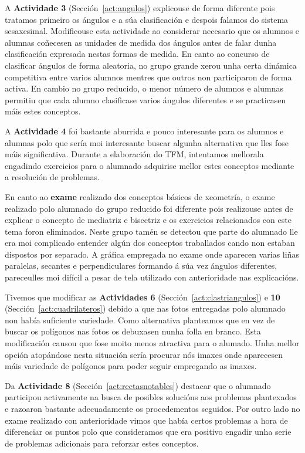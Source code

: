 A \textbf{Actividade 3} (Sección~\ref{act:angulos}) explicouse de forma diferente pois tratamos primeiro os ángulos e a súa clasificación e despois falamos do sistema sesaxesimal. Modificouse esta actividade ao considerar necesario que os alumnos e alumnas coñecesen as unidades de medida dos ángulos antes de falar dunha clasificación expresada nestas formas de medida. En canto ao concurso de clasificar ángulos de forma aleatoria, no grupo grande xerou unha certa dinámica competitiva entre varios alumnos mentres que outros non participaron de forma activa. En cambio no grupo reducido, o menor número de alumnos e alumnas permitiu que cada alumno clasificase varios ángulos diferentes e se practicasen máis estes conceptos.

A \textbf{Actividade 4} foi bastante aburrida e pouco interesante para os alumnos e alumnas polo que sería moi interesante buscar algunha alternativa que lles fose máis significativa. Durante a elaboración do TFM, intentamos mellorala engadindo exercicios para o alumnado adquirise mellor estes conceptos mediante a resolución de problemas.

En canto ao \textbf{exame} realizado dos conceptos básicos de xeometría, o exame realizado polo alumnado do grupo reducido foi diferente pois realizouse antes de explicar o concepto de mediatriz e bisectriz e os exercicios relacionados con este tema foron eliminados. Neste grupo tamén se detectou que parte do alumnado lle era moi complicado entender algún dos conceptos traballados cando non estaban dispostos por separado. A gráfica empregada no exame onde aparecen varias liñas paralelas, secantes e perpendiculares formando á súa vez ángulos diferentes, pareceulles moi difícil a pesar de tela utilizado con anterioridade nas explicacións.

Tivemos que modificar as \textbf{Actividades 6} (Sección~\ref{act:clastriangulos}) e \textbf{10} (Sección~\ref{act:cuadrilateros}) debido a que nas fotos entregadas polo alumnado non había suficiente variedade. Como alternativa planteamos que en vez de buscar os polígonos nas fotos os debuxasen nunha folla en branco. Esta modificación causou que fose moito menos atractiva para o alumado. Unha mellor opción atopándose nesta situación sería procurar nós imaxes onde aparecesen máis variedade de polígonos para poder seguir empregando as imaxes.

Da \textbf{Actividade 8} (Sección~\ref{act:rectasnotables}) destacar que o alumnado participou activamente na busca de posibles solucións aos problemas plantexados e razoaron bastante adecuadamente os procedementos seguidos. Por outro lado no exame realizado con anterioridade vimos que había certos problemas a hora de diferenciar os puntos polo que consideramos que era positivo engadir unha serie de problemas adicionais para reforzar estes conceptos.

